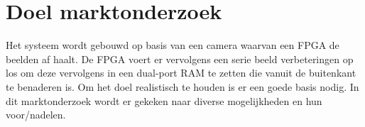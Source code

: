 \chapter{Doel marktonderzoek}

Het systeem wordt gebouwd op basis van een camera waarvan een FPGA de beelden af
haalt. De FPGA voert er vervolgens een serie beeld verbeteringen op los om deze
vervolgens in een dual-port RAM te zetten die vanuit de buitenkant te benaderen is.
Om het doel realistisch te houden is er een goede basis nodig. In dit
marktonderzoek wordt er gekeken naar diverse mogelijkheden en hun voor/nadelen.